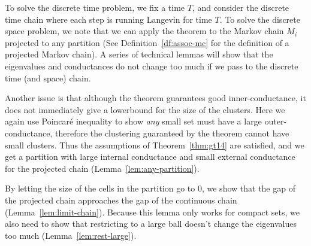 
To solve the discrete time problem, we fix a time $T$, and consider the discrete time chain where each step is running Langevin for time $T$. To solve the discrete space problem, we note that we can apply the theorem to the Markov chain $M_i$ projected to any partition (See Definition~\ref{df:assoc-mc} for the definition of a projected Markov chain). %
A series of technical lemmas will show that the eigenvalues and conductances do not change too much if we pass to the discrete time (and space) chain.

Another issue is that although the theorem guarantees good inner-conductance, it does not immediately give a lowerbound for the size of the clusters. Here we again use Poincar\'e inequality to show {\em any} small set must have a large outer-conductance, therefore the clustering guaranteed by the theorem cannot have small clusters.
Thus the assumptions of Theorem~\ref{thm:gt14} are satisfied, and we get a partition with large internal conductance and small external conductance for the projected chain (Lemma~\ref{lem:any-partition}). 

By letting the size of the cells in the partition go to 0, we show that the gap of the projected chain approaches the gap of the continuous chain (Lemma~\ref{lem:limit-chain}). Because this lemma only works for compact sets, we also need to show that restricting to a large ball doesn't change the eigenvalues too much (Lemma~\ref{lem:rest-large}).


